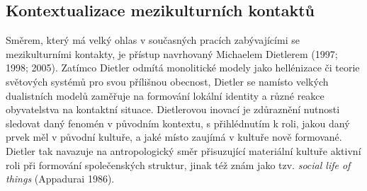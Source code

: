 \subsection[kontextualizace-mezikulturních-kontaktů]{Kontextualizace mezikulturních kontaktů}

Směrem, který má velký ohlas v současných pracích zabývajícími se mezikulturními kontakty, je přístup navrhovaný Michaelem Dietlerem (1997; 1998; 2005). Zatímco Dietler odmítá monolitické modely jako hellénizace či teorie světových systémů pro svou přílišnou obecnost, Dietler se namísto velkých dualistních modelů zaměřuje na formování lokální identity a různé reakce obyvatelstva na kontaktní situace. Dietlerovou inovací je zdůraznění nutnosti sledovat daný fenomén v původním kontextu, s přihlédnutím k roli, jakou daný prvek měl v původní kultuře, a jaké místo zaujímá v kultuře nově formované. Dietler tak navazuje na antropologický směr přisuzující materiální kultuře aktivní roli při formování společenských struktur, jinak též znám jako tzv. {\em social life of things} (Appadurai 1986).

